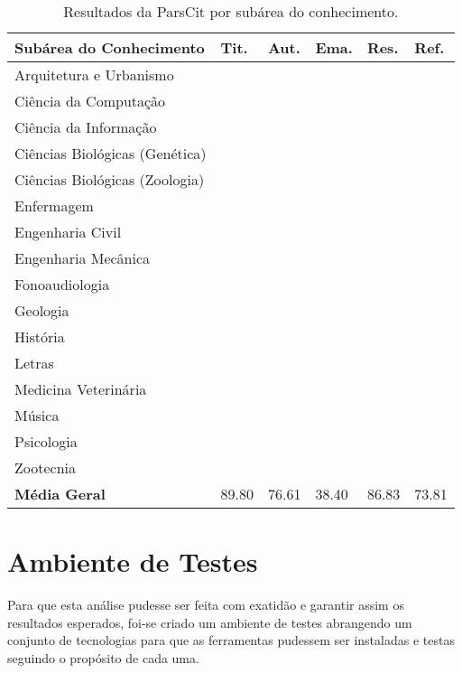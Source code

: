 \begin{table}
    \caption{Resultados da ParsCit por subárea do conhecimento.}
    \begin{center}
        \begin{tabular}{|p{6cm}|C{1.2cm}|C{1.2cm}|C{1.2cm}|C{1.2cm}|C{1.2cm}|}
            \hline 
            \textbf{Subárea do Conhecimento} & \textbf{Tit.} & \textbf{Aut.} & \textbf{Ema.} & \textbf{Res.} & \textbf{Ref.} \\ \hline 
            Arquitetura e Urbanismo &  &  &  &  &  \\ \hline
            Ciência da Computação &  &  &  &  &  \\ \hline
            Ciência da Informação &  &  &  &  &  \\ \hline
            Ciências Biológicas (Genética) &  &  &  &  &  \\ \hline
            Ciências Biológicas (Zoologia) &  &  &  &  &  \\ \hline
            Enfermagem &  &  &  &  &  \\ \hline
            Engenharia Civil &  &  &  &  &  \\ \hline
            Engenharia Mecânica &  &  &  &  &  \\ \hline
            Fonoaudiologia &  &  &  &  &  \\ \hline
            Geologia &  &  &  &  &  \\ \hline
            História &  &  &  &  &  \\ \hline
            Letras &  &  &  &  &  \\ \hline
            Medicina Veterinária &  &  &  &  &  \\ \hline
            Música &  &  &  &  &  \\ \hline
            Psicologia &  &  &  &  &  \\ \hline
            Zootecnia &  &  &  &  &  \\ \hline
            \textbf{Média Geral} & 89.80 & 76.61 & 38.40 & 86.83 & 73.81 \\ \hline
        \end{tabular}
    \end{center}
    \label{tab:results-parscit}
\end{table}

\section{Ambiente de Testes}

Para que esta análise pudesse ser feita com exatidão e garantir assim os resultados esperados, foi-se criado um ambiente de testes abrangendo um conjunto de tecnologias para que as ferramentas pudessem ser instaladas e testas seguindo o propósito de cada uma.

